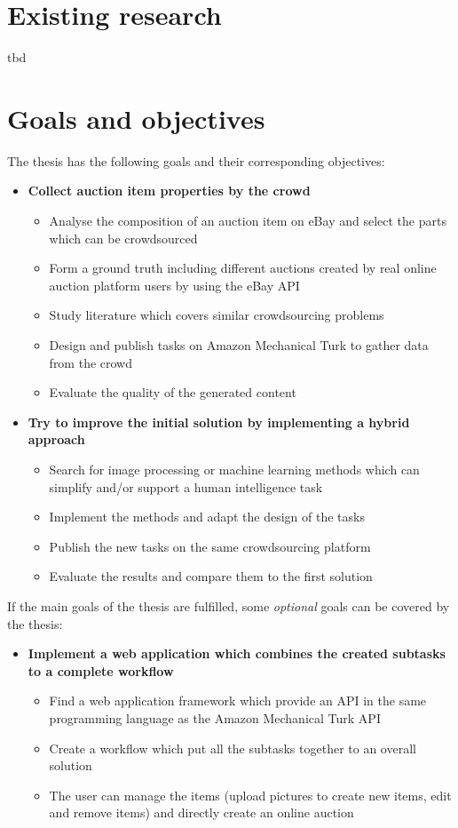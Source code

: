 \documentclass[a4paper]{report}
\begin{document}
\section{Existing research}
tbd

\section{Goals and objectives}
The thesis has the following goals and their corresponding objectives:
\begin{itemize}
	\item \textbf{Collect auction item properties by the crowd}
	\begin{itemize}
		\item Analyse the composition of an auction item on eBay and select the parts which can be crowdsourced
		\item Form a ground truth including different auctions created by real online auction platform users by using the eBay API
		\item Study literature which covers similar crowdsourcing problems
		\item Design and publish tasks on Amazon Mechanical Turk to gather data from the crowd
		\item Evaluate the quality of the generated content
	\end{itemize}
	\item \textbf{Try to improve the initial solution by implementing a hybrid approach}
	\begin{itemize}
		\item Search for image processing or machine learning methods which can simplify and/or support a human intelligence task
		\item Implement the methods and adapt the design of the tasks
		\item Publish the new tasks on the same crowdsourcing platform
		\item Evaluate the results and compare them to the first solution 
	\end{itemize}
\end{itemize}

If the main goals of the thesis are fulfilled, some \textit{optional} goals can be covered by the thesis:
\begin{itemize}
	\item \textbf{Implement a web application which combines the created subtasks to a complete workflow}
	\begin{itemize}
		\item Find a web application framework which provide an API in the same programming language as the Amazon Mechanical Turk API
		\item Create a workflow which put all the subtasks together to an overall solution
		\item The user can manage the items (upload pictures to create new items, edit and remove items) and directly create an online auction
	\end{itemize}
\end{itemize}
\end{document}
